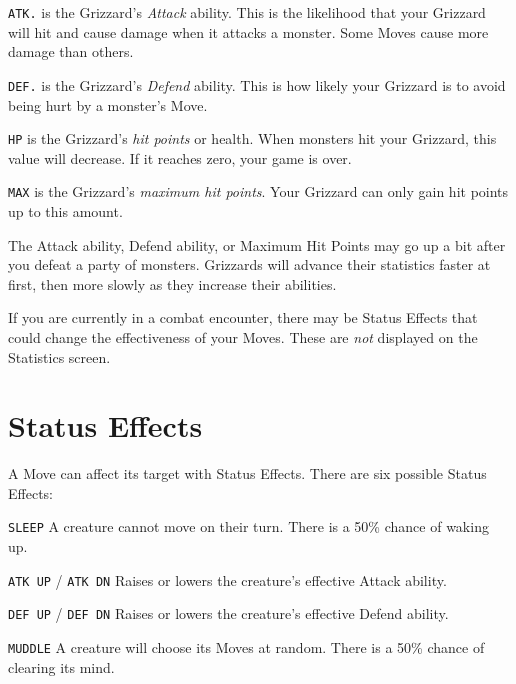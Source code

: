 \documentclass[9pt,twocolumn,openany,article]{memoir}
\newenvironment{rdescribe}{\begin{description}\raggedright}{\end{description}}
\begin{document}
\begin{rdescribe}
  
\item[\texttt{ATK.}] is  the Grizzard's  \emph{Attack} ability.  This is
  the likelihood  that your Grizzard will  hit and cause damage  when it
  attacks a monster. Some Moves cause more damage than others.
  
\item[\texttt{DEF.}] is  the Grizzard's  \emph{Defend} ability.  This is
  how likely your Grizzard is to avoid being hurt by a monster's Move.

\item[\texttt{HP}]  is  the  Grizzard's  \emph{hit  points}  or  health.
  When  monsters hit  your Grizzard,  this  value will  decrease. If  it
  reaches zero, your game is over.

\item[\texttt{MAX}]  is   the  Grizzard's  \emph{maximum   hit  points}.
  Your Grizzard can only gain hit points up to this amount.
  
\end{rdescribe}

The Attack  ability, Defend  ability, or  Maximum Hit  Points may  go up
a bit after you defeat a party of monsters. Grizzards will advance their
statistics  faster  at   first,  then  more  slowly   as  they  increase
their abilities.

If you are currently in a  combat encounter, there may be Status Effects
that could change the effectiveness  of your Moves. These are \emph{not}
displayed on the Statistics screen.

\section{Status Effects}\label{sec:StatusEffects}

A Move can affect its target with Status Effects. There are six possible
Status Effects:

\begin{rdescribe}
\item[\texttt{SLEEP}] A  creature cannot  move on their turn.  There is
  a 50\% chance of waking up.
\item[\texttt{ATK UP} / \texttt{ATK DN}] Raises or lowers the creature's
  effective Attack ability.
\item[\texttt{DEF UP} / \texttt{DEF DN}] Raises or lowers the creature's
  effective Defend ability.
\item[\texttt{MUDDLE}]  A  creature will  choose  its  Moves at  random.
  There is a 50\% chance of clearing its mind.
\end{rdescribe}
\end{document}
